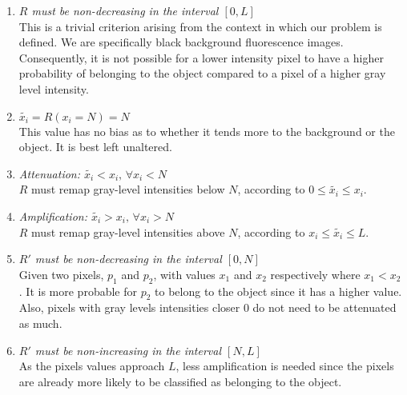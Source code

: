 \begin{enumerate}
	\item{}
	\textit{$R$ must be non-decreasing in the interval $[0, L]$}\\
	This is a trivial criterion arising from the context in which our problem is defined. We are specifically black background fluorescence images. Consequently, it is not possible for a lower intensity pixel to have a higher probability of belonging to the object compared to a pixel of a higher gray level intensity. 
	
	\item
	\textit{$\widetilde{x_i} = R(x_i=N) = N$}\\
	This value has no bias as to whether it tends more to the background or the object. It is best left unaltered.
	
	\item
	\textit{Attenuation: $\widetilde{x_i} < x_i, \, \forall x_i<N$}\\
	$R$ must remap gray-level intensities below $N$, according to $0 \leq \widetilde{x_i} \leq x_i$.
	
	\item
	\textit{Amplification: $\widetilde{x_i} > x_i, \, \forall x_i>N$}\\
	$R$ must remap gray-level intensities above $N$, according to $x_i \leq \widetilde{x_i} \leq L$.
	
	\item
	\textit{$R'$ must be non-decreasing in the interval $[0,N]$}\\
	Given two pixels, $p_1$ and $p_2$, with values $x_1$ and $x_2$ respectively where $x_1<x_2$. It is more probable for $p_2$ to belong to the object since it has a higher value. Also, pixels with gray levels intensities closer $0$ do not need to be attenuated as much.
	
	\item
	\textit{$R'$ must be non-increasing in the interval $[N,L]$}\\
	As the pixels values approach $L$, less amplification is needed since the pixels are already more likely to be classified as belonging to the object.
\end{enumerate}


